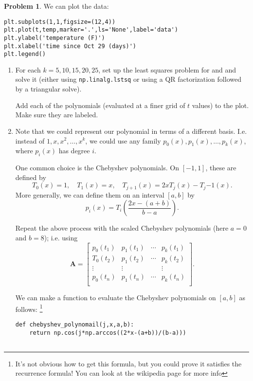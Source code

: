\documentclass[12pt]{article}
\theoremstyle{definition}
\newtheorem{problem}{Problem}
\renewcommand{\vec}{\mathbf}
\begin{document}
\begin{problem}
    We can plot the data:
    \begin{lstlisting}
plt.subplots(1,1,figsize=(12,4))
plt.plot(t,temp,marker='.',ls='None',label='data')
plt.ylabel('temperature (F)')
plt.xlabel('time since Oct 29 (days)')
plt.legend()
    \end{lstlisting}


    \begin{enumerate}
        \item 
        
        For each $k=5,10,15,20,25$, set up the least squares problem for and and solve it (either using \texttt{np.linalg.lstsq} or using a QR factorization followed by a triangular solve).

        Add each of the polynomials (evaluated at a finer grid of $t$ values) to the plot. Make sure they are labeled. 
    
        \item Note that we could represent our polynomial in terms of a different basis. I.e. instead of $1, x, x^2, \ldots, x^k$, we could use any family $p_0(x), p_1(x), \ldots, p_k(x)$, where $p_i(x)$ has degree $i$. 
        
        One common choice is the Chebyshev polynomials. On $[-1,1]$, these are  defined by
        \[
        T_{0}(x) = 1, \quad T_{1}(x) = x, \quad T_{j+1}(x) = 2xT_j(x) - T_j{-1}(x).
        \]
        More generally, we can define them on an interval $[a,b]$ by 
        \[
        p_i(x) = T_i\left(\frac{2x - (a+b)}{b-a}\right).
        \]

        Repeat the above process with the scaled Chebyshev polynomials (here $a=0$ and $b=8$); i.e. using 
        \[
        \vec{A} = 
        \begin{bmatrix}
        p_0(t_1) & p_1(t_1) & \cdots & p_k(t_1) \\
        T_0(t_2) & p_1(t_2) & \cdots & p_k(t_2) \\
        \vdots & \vdots & & \vdots \\
        p_0(t_n) & p_1(t_n) & \cdots & p_k(t_n) \\
        \end{bmatrix}.
        \]

        We can make a function to evaluate the Chebyshev polynomials on $[a,b]$ as follows: \footnote{It's not obvious how to get this formula, but you could prove it satisfies the recurrence formula! You can look at the wikipedia page for more info}
        \begin{lstlisting}
def chebyshev_polynomail(j,x,a,b):
    return np.cos(j*np.arccos((2*x-(a+b))/(b-a)))
                    

\end{lstlisting}
\end{enumerate}
\end{problem}
\end{document}
